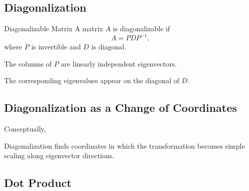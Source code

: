 \subsection{Diagonalization}
\label{subsec:diagonalization}

\begin{definitionbox}{Diagonalizable Matrix}
A matrix \(A\) is diagonalizable if
\[ A=PDP^{-1}, \]
where \(P\) is invertible and \(D\) is diagonal.
\end{definitionbox}

The columns of \(P\) are linearly independent eigenvectors.

The corresponding eigenvalues appear on the diagonal of \(D\).

\subsection{Diagonalization as a Change of Coordinates}
\label{subsec:diagonalization-visual}

Conceptually,

\begin{center}
\end{center}

Diagonalization finds coordinates in which the transformation becomes simple
scaling along eigenvector directions.

\subsection{Dot Product}
\label{subsec:dot-product}


